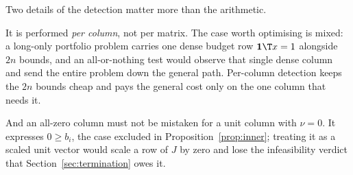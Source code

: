 Two details of the detection matter more than the arithmetic.

It is performed \emph{per column}, not per matrix. The case worth optimising is
mixed: a long-only portfolio problem carries one dense budget row
$\mathbf{1}\T x = 1$ alongside $2n$ bounds, and an all-or-nothing test would
observe that single dense column and send the entire problem down the general
path. Per-column detection keeps the $2n$ bounds cheap and pays the general cost
only on the one column that needs it.

And an all-zero column must not be mistaken for a unit column with $\nu = 0$. It
expresses $0 \ge b_i$, the case excluded in Proposition~\ref{prop:inner}; treating
it as a scaled unit vector would scale a row of $J$ by zero and lose the
infeasibility verdict that Section~\ref{sec:termination} owes it.
